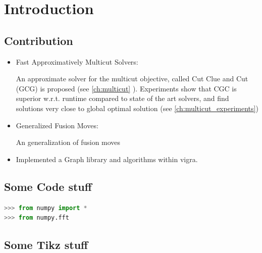 
\chapter{Introduction} %

\label{ch:introduction} %



\section{Contribution}\label{sec:Contribution}


\begin{itemize}
    \item Fast Approximatively Multicut Solvers:

        An approximate solver for the multicut objective, 
        called Cut Clue and Cut (GCG) is proposed (see \ref{ch:multicut} ).
        Experiments show  that CGC is superior w.r.t. 
        runtime compared to state of the art solvers, and find solutions
        very close to global optimal solution (see \ref{ch:multicut_experiments}) 

    \item Generalized Fusion Moves:

        An generalization of fusion moves \cite{lempitsky_2010_pami}


    \item Implemented a Graph library and algorithms within vigra.


\end{itemize}




\section{Some Code stuff}
\begin{lstlisting}[language=python]
>>> from numpy import *
>>> from numpy.fft
\end{lstlisting}
\section{Some Tikz stuff}







